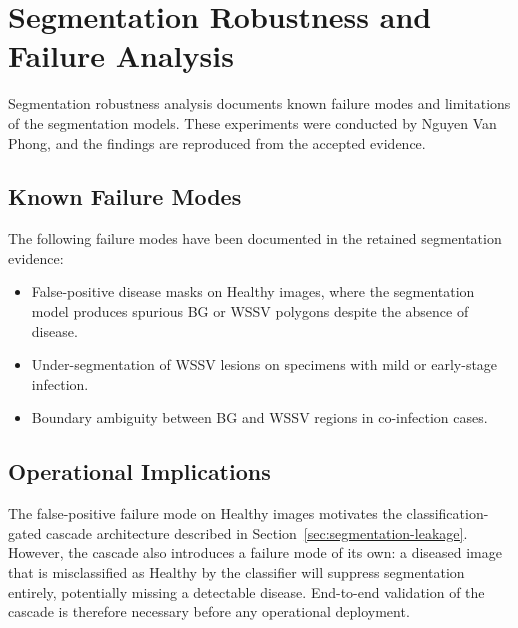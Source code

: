 
\section{Segmentation Robustness and Failure Analysis}
\label{sec:segmentation-robustness}

Segmentation robustness analysis documents known failure modes and limitations of the segmentation models. These experiments were conducted by Nguyen Van Phong, and the findings are reproduced from the accepted evidence.

\subsection{Known Failure Modes}
\label{sec:segmentation-failures}

The following failure modes have been documented in the retained segmentation evidence:

\begin{itemize}
    \item False-positive disease masks on Healthy images, where the segmentation model produces spurious BG or WSSV polygons despite the absence of disease.
    \item Under-segmentation of WSSV lesions on specimens with mild or early-stage infection.
    \item Boundary ambiguity between BG and WSSV regions in co-infection cases.
\end{itemize}

\subsection{Operational Implications}
\label{sec:segmentation-operational}

The false-positive failure mode on Healthy images motivates the classification-gated cascade architecture described in Section~\ref{sec:segmentation-leakage}. However, the cascade also introduces a failure mode of its own: a diseased image that is misclassified as Healthy by the classifier will suppress segmentation entirely, potentially missing a detectable disease. End-to-end validation of the cascade is therefore necessary before any operational deployment.